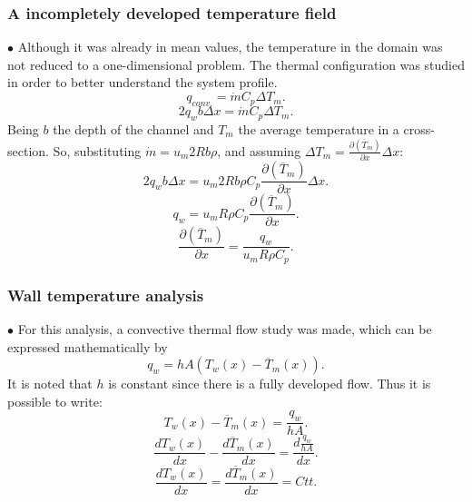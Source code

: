\documentclass[xcolor=dvipsnames,8pt,aspectratio=34]{beamer}
\begin{document}
		
	
	
	
		\begin{frame}
		\frametitle{A incompletely developed temperature field}
		$\bullet$ Although it was already in mean values, the temperature in the domain was not reduced to a one-dimensional problem. The thermal configuration was studied in order to better understand the system profile.
		\begin{equation}\label{c_h_e}
		q_{conv.} = \dot{m} C_p \Delta T_m.
		\end{equation}
		\begin{equation}
		2q_w b \Delta x = \dot{m} C_p \Delta T_m.
		\end{equation}
		Being $b$ the depth of the channel and $T_m$ the average temperature in a cross-section. So, substituting $ \dot{m} = u_m 2R b \rho $, and assuming $ \Delta T_m = \frac{\partial{\left(\overline{T}_m\right)}}{\partial{x}} \Delta x $:
		\begin{equation}
		2q_w b \Delta x = u_m 2R b \rho  C_p \frac{\partial{\left(\overline{T}_m\right)}}{\partial{x}} \Delta x.
		\end{equation}     
		\begin{equation}
		q_w = u_m R \rho  C_p \frac{\partial{\left(\overline{T}_m\right)}}{\partial{x}} .
		\end{equation} 
		\begin{equation}\label{c_h_ee}
		\frac{\partial{\left(\overline{T}_m\right)}}{\partial{x}} = \frac{q_w}{u_m  R \rho  C_p } .
		\end{equation} 
		\end{frame}
	
	
	
	
		\begin{frame}
		\frametitle{Wall temperature analysis}
		$\bullet$ For this analysis, a convective thermal flow study was made, which can be expressed mathematically by
		\begin{equation}
		q_w = h A \left( T_w(x) - \overline{T}_m(x)\right).
		\end{equation}
		It is noted that $h$ is constant since there is a fully developed flow. Thus it is possible to write:
		\begin{equation}
		 T_w(x) - \overline{T}_m(x) = \frac{q_w}{hA}.
		\end{equation}
		\begin{equation}
		\frac{d T_w(x)}{d x} - \frac{d \overline{T}_m(x)}{d x} = \frac{d \frac{q_w}{hA}}{dx}.
		\end{equation}
		\begin{equation}
		\frac{d T_w(x)}{d x} = \frac{d \overline{T}_m(x)}{d x} = Ctt.
		\end{equation}	
		\end{frame}
	
\end{document}
